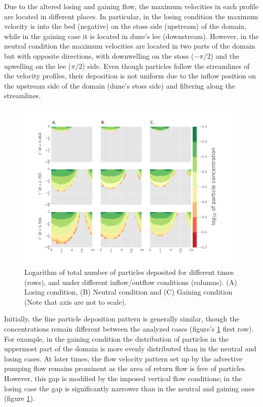 \documentclass[draft,linenumbers]{agujournal2018}
\begin{document}
Due to the altered losing and gaining flow, the maximum velocities in each profile are located in different places. In particular, in the losing condition the maximum velocity is into the bed (negative) on the stoss side (upstream) of the domain, while in the gaining case it is located in dune's lee (downstream). However, in the neutral condition the maximum velocities are located in two parts of the domain but with opposite directions, with downwelling on the stoss ($-\pi /2$) and the upwelling on the lee ($\pi/2$) side. Even though particles follow the streamlines of the velocity profiles, their deposition is not uniform due to the inflow position on the upstream side of the domain (dune's stoss side) and filtering along the streamlines.

\begin{figure}
\centering
\includegraphics[trim=0.2cm 0.2cm 0.2cm 0.2cm, width=60pc]
{190131_Logplot.pdf}
\caption{Logarithm of total number of particles deposited for different times (rows), and under different inflow/outflow conditions (columns). (A) Losing condition, (B) Neutral condition and (C) Gaining condition (Note that axis are not to scale).}
\label{Logmap}
\end{figure}

Initially, the fine particle deposition pattern is generally similar, though the concentrations remain different between the analyzed cases (figure's \ref{Logmap} first row). For example, in the gaining condition the distribution of particles in the uppermost part of the domain is more evenly distributed than in the neutral and losing cases. At later times, the flow velocity pattern set up by the advective pumping flow remains prominent as the area of return flow is free of particles.  However, this gap is modified by the imposed vertical flow conditions; in the losing case the gap is significantly narrower than in the neutral and gaining ones (figure \ref{Logmap}). 
\end{document}
